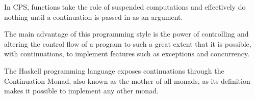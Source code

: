 In CPS, functions take the role of suspended computations and effectively do nothing until a continuation is passed in as an argument.

The main advantage of this programming style is the power of controlling and altering the control flow of a program to such a great extent that it is possible, with continuations, to implement features such as exceptions and concurrency.

The Haskell programming language exposes continuations through the Continuation Monad, also known as the mother of all monads, as its definition makes it possible to implement any other monad.





\